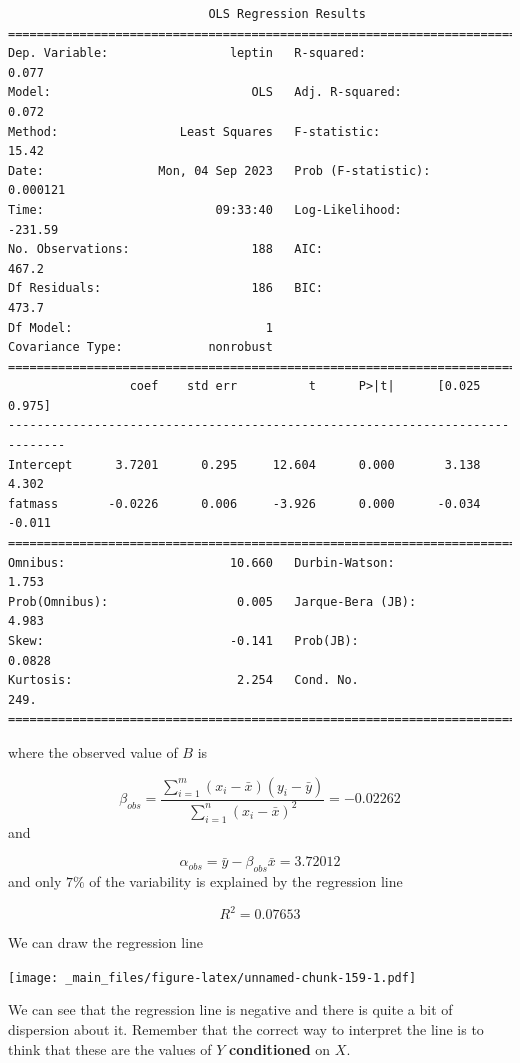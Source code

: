 \documentclass[
]{book}
\begin{document}
\begin{verbatim}
                            OLS Regression Results                            
==============================================================================
Dep. Variable:                 leptin   R-squared:                       0.077
Model:                            OLS   Adj. R-squared:                  0.072
Method:                 Least Squares   F-statistic:                     15.42
Date:                Mon, 04 Sep 2023   Prob (F-statistic):           0.000121
Time:                        09:33:40   Log-Likelihood:                -231.59
No. Observations:                 188   AIC:                             467.2
Df Residuals:                     186   BIC:                             473.7
Df Model:                           1                                         
Covariance Type:            nonrobust                                         
==============================================================================
                 coef    std err          t      P>|t|      [0.025      0.975]
------------------------------------------------------------------------------
Intercept      3.7201      0.295     12.604      0.000       3.138       4.302
fatmass       -0.0226      0.006     -3.926      0.000      -0.034      -0.011
==============================================================================
Omnibus:                       10.660   Durbin-Watson:                   1.753
Prob(Omnibus):                  0.005   Jarque-Bera (JB):                4.983
Skew:                          -0.141   Prob(JB):                       0.0828
Kurtosis:                       2.254   Cond. No.                         249.
==============================================================================

\end{verbatim}

where the observed value of \(B\) is

\[\beta_{obs}= \frac{\sum_{i=1}^m(x_i-\bar{x})(y_i-\bar{y})}{\sum_{i=1}^n(x_i-\bar{x})^2}= -0.02262\]
and

\[\alpha_{obs}=\bar{y}-\beta_{obs}\bar{x}= 3.72012\]
and only \(7\%\) of the variability is explained by the regression line

\[R^2=0.07653\]

We can draw the regression line

\texttt{[image: \_main\_files/figure-latex/unnamed-chunk-159-1.pdf]}

We can see that the regression line is negative and there is quite a bit of dispersion about it. Remember that the correct way to interpret the line is to think that these are the values of \(Y\) \textbf{conditioned} on \(X\).
\end{document}
